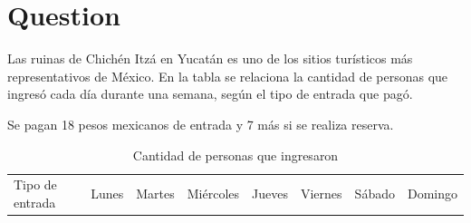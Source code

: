 \documentclass[
]{article}
\author{}
\date{\vspace{-2.5em}}
\begin{document}
\section{Question}\label{question}

Las ruinas de Chichén Itzá en Yucatán es uno de los sitios turísticos
más representativos de México. En la tabla se relaciona la cantidad de
personas que ingresó cada día durante una semana, según el tipo de
entrada que pagó.

Se pagan 18 pesos mexicanos de entrada y 7 más si se realiza reserva.

\begin{longtable}[]{@{}
  >{\raggedright\arraybackslash}p{}
  >{\centering\arraybackslash}p{}
  >{\centering\arraybackslash}p{}
  >{\centering\arraybackslash}p{}
  >{\centering\arraybackslash}p{}
  >{\centering\arraybackslash}p{}
  >{\centering\arraybackslash}p{}
  >{\centering\arraybackslash}p{}@{}}
\caption{Cantidad de personas que ingresaron}\tabularnewline
\toprule\noalign{}
\begin{minipage}[b]{\linewidth}\raggedright
Tipo de entrada
\end{minipage} & \begin{minipage}[b]{\linewidth}\centering
Lunes
\end{minipage} & \begin{minipage}[b]{\linewidth}\centering
Martes
\end{minipage} & \begin{minipage}[b]{\linewidth}\centering
Miércoles
\end{minipage} & \begin{minipage}[b]{\linewidth}\centering
Jueves
\end{minipage} & \begin{minipage}[b]{\linewidth}\centering
Viernes
\end{minipage} & \begin{minipage}[b]{\linewidth}\centering
Sábado
\end{minipage} & \begin{minipage}[b]{\linewidth}\centering
Domingo
\end{minipage} \\

\end{longtable}
\end{document}
